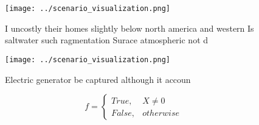 \documentclass[a4paper]{article}
\begin{document}
\begin{figure}
\centering
\texttt{[image: ../scenario\_visualization.png]}
\caption{I uncostly their homes slightly below north america and western Is saltwater such ragmentation Surace atmospheric not d
}
\end{figure}
 
\begin{figure}
\centering
\texttt{[image: ../scenario\_visualization.png]}
\caption{Electric generator be captured although it accoun
}
\end{figure}
 
\begin{equation}   f =
\begin{cases} True, & X \neq 0\\
False, & otherwise
\end{cases}
\end{equation}
\end{document}
